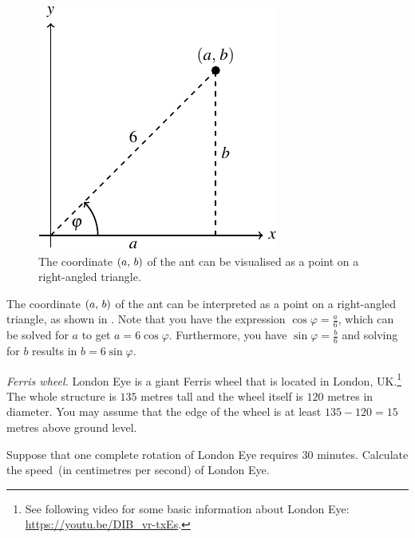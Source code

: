 \documentclass[a4paper,oneside,12pt]{article}
\begin{document}
\begin{problem}
{\begin{solution}
\begin{figure}[!htbp]
\centering
\includegraphics[scale=1.1]{image/13/right-triangle.pdf}
\caption{%
  The coordinate $\left\lparen{a},\, {b}\right\rparen$ of the ant can be visualised as a
  point on a right-angled triangle.
}
\label{fig:trigonometric:ant_coordinate}
\end{figure}

The coordinate $\left\lparen{a},\, {b}\right\rparen$ of the ant can be interpreted as a point
on a right-angled triangle, as shown in
.  Note that you have the
expression $\cos\varphi = \frac{a}{6}$, which can be solved for $a$ to
get $a = 6 \cos\varphi$.  Furthermore, you have
$\sin\varphi = \frac{b}{6}$ and solving for $b$ results in
$b = 6 \sin\varphi$.
\end{solution}
}{}

\item\emph{Ferris wheel.}
  London Eye is a giant Ferris wheel that is located in London,
  UK.\footnote{
    See following video for some basic information about London Eye:
    \url{https://youtu.be/DIB_vr-txEs}.
  }
  The whole structure is $135$ metres tall and the wheel itself is
  $120$ metres in diameter.  You may assume that the edge of the wheel
  is at least $135 - 120 = 15$ metres above ground level.
  \begin{packedenum}
  \item\label{subprob:trigonometric:London_Eye_speed}
    Suppose that one complete rotation of London Eye requires $30$
    minutes.  Calculate the speed~(in centimetres per second) of
    London Eye.


\end{packedenum}
\end{problem}
\end{document}
